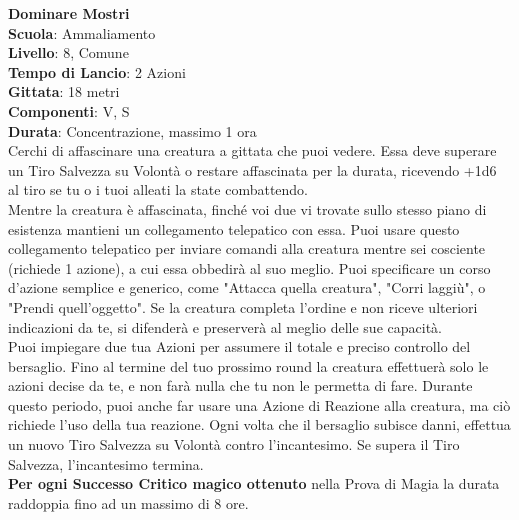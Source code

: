 \begin{multicols}{2}
\medskip\textbf{Dominare Mostri}\\
\textbf{Scuola}: Ammaliamento\\
\textbf{Livello}: 8, Comune\\
\textbf{Tempo di Lancio}: 2 Azioni\\
\textbf{Gittata}: 18 metri\\
\textbf{Componenti}: V, S\\
\textbf{Durata}: Concentrazione, massimo 1 ora\\
Cerchi di affascinare una creatura a gittata che puoi vedere. Essa deve superare un Tiro Salvezza su Volontà o restare affascinata per la durata, ricevendo +1d6 al tiro se tu o i tuoi alleati la state combattendo.\\
Mentre la creatura è affascinata, finché voi due vi trovate sullo stesso piano di esistenza mantieni un collegamento telepatico con essa. Puoi usare questo collegamento telepatico per inviare comandi alla creatura mentre sei cosciente (richiede 1 azione), a cui essa obbedirà al suo meglio. Puoi specificare un corso d'azione semplice e generico, come "Attacca quella creatura", "Corri laggiù", o "Prendi quell'oggetto". Se la creatura completa l'ordine e non riceve ulteriori indicazioni da te, si difenderà e preserverà al meglio delle sue capacità.\\
Puoi impiegare due tua Azioni per assumere il totale e preciso controllo del bersaglio. Fino al termine del tuo prossimo round la creatura effettuerà solo le azioni decise da te, e non farà nulla che tu non le permetta di fare. Durante questo periodo, puoi anche far usare una Azione di Reazione alla creatura, ma ciò richiede l'uso della tua reazione. Ogni volta che il bersaglio subisce danni, effettua un nuovo Tiro Salvezza su Volontà contro l'incantesimo. Se supera il Tiro Salvezza, l'incantesimo termina.\\
\textbf{Per ogni Successo Critico magico ottenuto} nella Prova di Magia la durata raddoppia fino ad un massimo di 8 ore.


\end{multicols}

